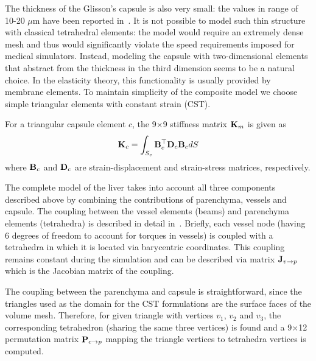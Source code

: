 The thickness of the Glisson's capsule is also very small: the values in range of 10-20 $\mu$m have been reported in~\cite{Umale2011}.
It is not possible to model such thin structure with classical tetrahedral elements:
the model would require an extremely 
dense mesh and thus would significantly violate the speed requirements imposed for medical simulators.
Instead, modeling the capsule with two-dimensional elements that abstract from the
thickness in the third dimension seems
to be a natural choice. In the elasticity theory, this functionality is usually provided by membrane elements.
To maintain simplicity of the composite model we choose simple triangular elements with constant strain (CST).

For a triangular capsule element $c$, the 9$\times$9 stiffness matrix $\mathbf{K}_m$ is given as 
\begin{equation}
 \mathbf{K}_c = \int_{S_c} \mathbf{B}_c^\top \mathbf{D}_c \mathbf{B}_c dS 
\end{equation}
where $\mathbf{B}_c$ and $\mathbf{D}_c$ are strain-displacement and strain-stress matrices, respectively. 

The complete model of the liver takes into account all three components described above by combining the contributions 
of parenchyma, vessels and capsule. The coupling between the vessel elements (beams) and parenchyma elements (tetrahedra)
is described in detail in~\cite{Peterlik2012}. Briefly, each vessel node (having 6 degrees of freedom to account for torques in vessels) 
is coupled with a tetrahedra in which it is located via barycentric coordinates. This coupling remains constant during 
the simulation and can be described via matrix $\mathbf{J}_{v\rightarrow p}$ which is the Jacobian matrix of the coupling.

The coupling between the parenchyma and capsule is straightforward, since the triangles used as the 
domain for the CST formulations are the surface faces of the volume mesh. Therefore, for given triangle 
with vertices $v_1$, $v_2$ and $v_3$, the corresponding tetrahedron (sharing the same three vertices) is found and 
a 9$\times$12 permutation matrix $\mathbf{P}_{c\rightarrow p}$ mapping the triangle vertices to tetrahedra vertices is computed. 

